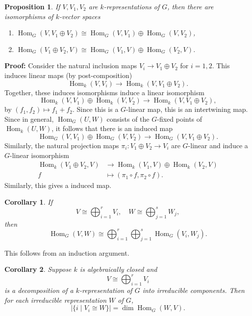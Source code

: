 \documentclass[12pt]{article}
\DeclareMathOperator{\Hom}{Hom}
\newtheorem{corollary}{Corollary}[section]
\newtheorem{proposition}{Proposition}[section]
\theoremstyle{definition}
\theoremstyle{remark}
\begin{document}
\begin{proposition}
	If $V, V_1, V_2$ are $k$-representations of $G$, then there are isomorphisms of $k$-vector spaces
	\begin{enumerate}[\normalfont(i)]
		\item $\Hom_G(V, V_1 \oplus V_2) \cong \Hom_G(V, V_1) \oplus \Hom_G(V, V_2)$,
		\item $\Hom_G(V_1 \oplus V_2, V) \cong \Hom_G(V_1, V) \oplus \Hom_G(V_2, V)$.
	\end{enumerate}
\end{proposition}

\begin{adjustbox}{minipage = \columnwidth - 25.5pt, margin=1em, frame=1pt, margin=0em}
	\textbf{Proof:} Consider the natural inclusion maps $V_i \to V_1 \oplus V_2$ for $i = 1, 2$. This induces linear maps (by post-composition)
	\[
		\Hom_k(V, V_i) \to \Hom_k(V, V_1 \oplus V_2)
	.\]
	Together, these induces isomorphisms induce a linear isomorphism
	\[
		\Hom_k(V, V_1) \oplus \Hom_k(V, V_2) \to \Hom_k(V, V_1 \oplus V_2)
	,\]
	by $(f_1, f_2) \mapsto f_1 + f_2$. Since this is a $G$-linear map, this is an intertwining map. Since in general, $\Hom_G(U, W)$ consists of the $G$-fixed points of $\Hom_k(U, W)$, it follows that there is an induced map
	\[
		\Hom_G(V, V_1) \oplus \Hom_G(V, V_2) \to \Hom_G(V, V_1 \oplus V_2)
	.\]
	Similarly, the natural projection maps $\pi_i : V_1 \oplus V_2 \to V_i$ are $G$-linear and induce a $G$-linear isomorphism
	\begin{align*}
		\Hom_k(V_1 \oplus V_2, V) &\to \Hom_k(V_1, V) \oplus \Hom_k(V_2, V) \\
		f &\mapsto (\pi_1 \circ f, \pi_2 \circ f).
	\end{align*}
	Similarly, this gives a induced map.
\end{adjustbox}

\begin{corollary}
	If
	\[
	V \cong \bigoplus_{i = 1}^{r} V_i, \quad W \cong \bigoplus_{j = 1}^{s} W_j
	,\]
	then
	\[
		\Hom_G(V, W) \cong \bigoplus_{i = 1}^{r} \bigoplus_{j = 1}^{s} \Hom_G(V_i, W_j)
	.\]
\end{corollary}

This follows from an induction argument.

\begin{corollary}
	Suppose $k$ is algebraically closed and
	\[
	V \cong \bigoplus_{i = 1}^{r} V_i
	\]
	is a decomposition of a $k$-representation of $G$ into irreducible components. Then for each irreducible representation $W$ of $G$,
	\[
		|\{i \mid V_i \cong W\}| = \dim \Hom_G(W, V)
	.\]
\end{corollary}
\end{document}
